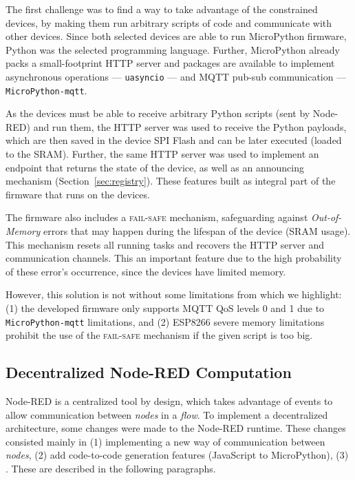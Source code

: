 The first challenge was to find a way to take advantage of the constrained devices, by making them run arbitrary scripts of code and communicate with other devices. Since both selected devices are able to run MicroPython firmware, Python was the selected programming language. Further, MicroPython already packs a small-footprint HTTP server and packages are available to implement asynchronous operations --- \ie \texttt{uasyncio} --- and MQTT pub-sub communication --- \ie \texttt{MicroPython-mqtt}.


As the devices must be able to receive arbitrary Python scripts (sent by Node-RED) and run them, the HTTP server was used to receive the Python payloads, which are then saved in the device SPI Flash and can be later executed (loaded to the SRAM). Further, the same HTTP server was used to implement an endpoint that returns the state of the device, as well as an announcing mechanism (\cf Section~\ref{sec:registry}). These features built as integral part of the firmware that runs on the devices.

The firmware also includes a \textsc{fail-safe} mechanism, safeguarding against \textit{Out-of-Memory} errors that may happen during the lifespan of the device (SRAM usage). This mechanism resets all running tasks and recovers the HTTP server and communication channels. This an important feature due to the high probability of these error's occurrence, since the devices have limited memory. 

However, this solution is not without some limitations from which we highlight: (1) the developed firmware only supports MQTT QoS levels 0 and 1 due to \texttt{MicroPython-mqtt} limitations, and (2) ESP8266 severe memory limitations prohibit the use of the \textsc{fail-safe} mechanism if the given script is too big.

\subsection{Decentralized Node-RED Computation}\label{sec:node_red_decentralization}

Node-RED is a centralized tool by design, which takes advantage of events to allow communication between \textit{nodes} in a \textit{flow}. To implement a decentralized architecture, some changes were made to the Node-RED runtime. These changes consisted mainly in (1) implementing a new way of communication between \textit{nodes}, (2) add code-to-code generation features (\ie JavaScript to MicroPython), (3) . These are described in the following paragraphs.

